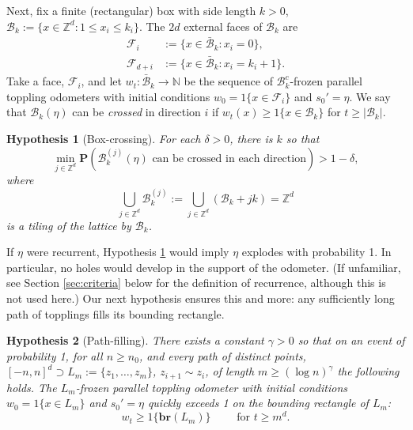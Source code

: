 \documentclass[aap]{imsart}
\newcommand{\Z}{\mathbb{Z}}
\newcommand{\N}{\mathbb{N}}
\newcommand{\br}{\mathbf{br}}  %
\newtheorem{hyp}{Hypothesis}
\begin{document}
Next, fix a finite (rectangular) box with side length $k > 0$,  $\mathcal{B}_{k} := \{ x \in \Z^d : 1 \leq x_i \leq k_i \}$.
The $2 d$ external faces of $\mathcal{B}_k$ are 
\[
\begin{aligned}
\mathcal{F}_i &:= \{ x \in \bar{\mathcal{B}}_k : x_i = 0\}, \\
\mathcal{F}_{d+i} &:= \{x \in \bar{\mathcal{B}}_k : x_i = k_i+1\}.
\end{aligned}
\]
Take a face, $\mathcal{F}_i$, and let $w_t: \bar{\mathcal{B}}_k \to \N$ be the sequence of $\mathcal{B}_k^c$-frozen parallel toppling odometers with initial conditions  $w_0 = 1\{ x \in \mathcal{F}_i\}$ and $s_0' = \eta$. We say that $\mathcal{B}_k(\eta)$ can be {\it crossed} in direction $i$ if $w_{t}(x) \geq 1\{x \in \mathcal{B}_k \}$ for $t \geq |\mathcal{B}_k|$. 


\begin{hyp}[Box-crossing] \label{hyp:box_crossing}
	For each $\delta > 0$, there is $k$ so that 
	\[
	\min_{j \in \Z^d} \mathbf{P}(\mathcal{B}^{(j)}_k(\eta) \mbox{ can be crossed in each direction}) > 1 - \delta, 
	\]
	where 
	\[
	\bigcup_{j \in \Z^d} \mathcal{B}^{(j)}_{k} := \bigcup_{j \in \Z^d} (\mathcal{B}_k + j  k) = \Z^d
	\]
	is a tiling of the lattice by $\mathcal{B}_k$.
	
\end{hyp}
If $\eta$ were recurrent, Hypothesis \ref{hyp:box_crossing} would imply $\eta$ explodes with probability 1. In particular,  no holes would develop in the support of the odometer. (If unfamiliar, see Section \ref{sec:criteria}
below for the definition of recurrence, although this is not used here.) Our next hypothesis 
ensures this and more: any sufficiently long path of topplings fills its bounding rectangle.

\begin{hyp}[Path-filling] \label{hyp:path_filling}
	There exists a constant $\gamma > 0$ so that on an event of probability 1, for all $n \geq n_0$, and every path of
	distinct points, $[-n,n]^d \supset L_m := \{z_1, \ldots, z_m\}$, $z_{i+1} \sim z_i$, of length $m \geq  (\log n)^{\gamma}$ the following holds. 
	The $L_m$-frozen parallel toppling odometer with initial conditions $w_0 = 1\{ x \in L_m\}$ and $s_0' = \eta$
	quickly exceeds 1 on the bounding rectangle of $L_m$:
	\[
	w_t \geq 1 \{ \br(L_m) \}  \qquad \mbox{ for $t \geq m^d$.}  
	\]
\end{hyp}
\end{document}
